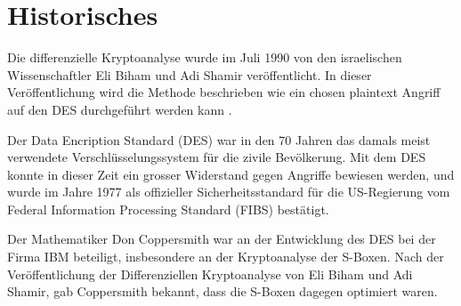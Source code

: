 \section{Historisches}\label{sec:Historisches}

Die differenzielle Kryptoanalyse wurde im Juli 1990 von den israelischen Wissenschaftler Eli Biham und Adi Shamir veröffentlicht. In dieser Veröffentlichung wird die Methode beschrieben wie ein chosen plaintext Angriff auf den DES durchgeführt werden kann \cite{biham_differential_1990}.

Der Data Encription Standard (DES) war in den 70 Jahren das damals meist verwendete Verschlüsselungssystem für die zivile Bevölkerung. Mit dem DES konnte in dieser Zeit ein grosser Widerstand gegen Angriffe bewiesen werden, und wurde im Jahre 1977 als offizieller Sicherheitsstandard für die US-Regierung vom Federal Information Processing Standard (FIBS) bestätigt. 

Der Mathematiker Don Coppersmith war an der Entwicklung des DES bei der Firma IBM beteiligt, insbesondere an der Kryptoanalyse der S-Boxen. Nach der Veröffentlichung der Differenziellen Kryptoanalyse von Eli Biham und Adi Shamir, gab Coppersmith bekannt, dass die S-Boxen dagegen optimiert waren. 




